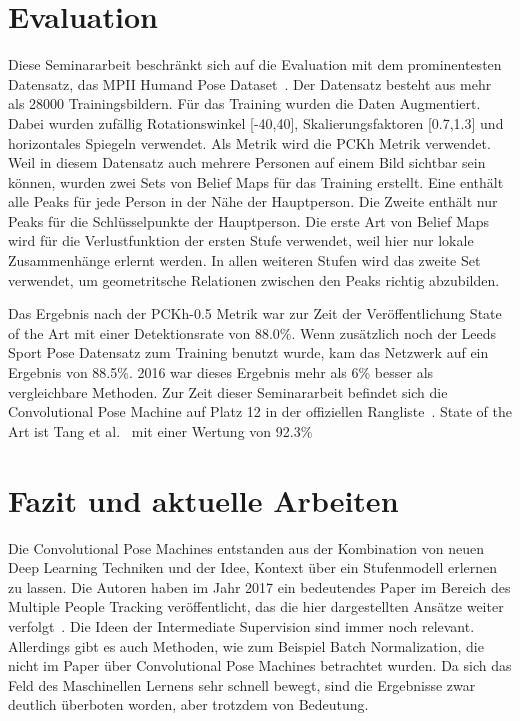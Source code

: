 \documentclass[journal, a4paper]{IEEEtran}
\begin{document}
\section{Evaluation}

        Diese Seminararbeit beschränkt sich auf die Evaluation mit dem prominentesten Datensatz, das MPII Humand Pose Dataset~\cite{MPII}. Der Datensatz besteht aus mehr als 28000 Trainingsbildern. Für das Training wurden die Daten Augmentiert. Dabei wurden zufällig Rotationswinkel [-40\degree,40\degree], Skalierungsfaktoren [0.7,1.3] und horizontales Spiegeln verwendet. Als Metrik wird die PCKh Metrik verwendet. %
        Weil in diesem Datensatz auch mehrere Personen auf einem Bild sichtbar sein können, wurden zwei Sets von Belief Maps für das Training erstellt. Eine enthält alle Peaks für jede Person in der Nähe der Hauptperson. Die Zweite enthält nur Peaks für die Schlüsselpunkte der Hauptperson.
        Die erste Art von Belief Maps wird für die Verlustfunktion der ersten Stufe verwendet, weil hier nur lokale Zusammenhänge erlernt werden. In allen weiteren Stufen wird das zweite Set verwendet, um geometritsche Relationen zwischen den Peaks richtig abzubilden.

        Das Ergebnis nach der PCKh-0.5 Metrik war zur Zeit der Veröffentlichung State of the Art mit einer Detektionsrate von 88.0\%. Wenn zusätzlich noch der Leeds Sport Pose Datensatz zum Training benutzt wurde, kam das Netzwerk auf ein Ergebnis von 88.5\%. 2016 war dieses Ergebnis mehr als 6\% besser als vergleichbare Methoden. Zur Zeit dieser Seminararbeit befindet sich die Convolutional Pose Machine auf Platz 12 in der offiziellen Rangliste~\cite{MPII}. State of the Art ist Tang et al.~\cite{tang2018deeply} mit einer Wertung von 92.3\%
        
\section{Fazit und aktuelle Arbeiten}
        Die Convolutional Pose Machines entstanden aus der Kombination von neuen Deep Learning Techniken und der Idee, Kontext über ein Stufenmodell erlernen zu lassen. Die Autoren haben im Jahr 2017 ein bedeutendes Paper im Bereich des Multiple People Tracking veröffentlicht, das die hier dargestellten Ansätze weiter verfolgt~\cite{cao2017realtime,wei2016cpm}. Die Ideen der Intermediate Supervision sind immer noch relevant. Allerdings gibt es auch Methoden, wie zum Beispiel Batch Normalization, die nicht im Paper über Convolutional Pose Machines betrachtet wurden. Da sich das Feld des Maschinellen Lernens sehr schnell bewegt, sind die Ergebnisse zwar deutlich überboten worden, aber trotzdem von Bedeutung.



\renewcommand\bibname{Literatur}

\end{document}
